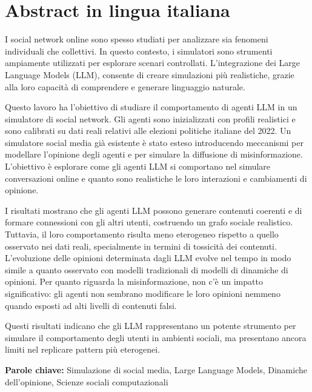 \section*{Abstract in lingua italiana}
I social network online sono spesso studiati per analizzare sia fenomeni individuali che collettivi. 
In questo contesto, i simulatori sono strumenti ampiamente utilizzati per esplorare scenari controllati.
L’integrazione dei Large Language Models (LLM), consente di creare simulazioni più realistiche, grazie alla loro capacità di comprendere e generare linguaggio naturale.

Questo lavoro ha l’obiettivo di studiare il comportamento di agenti LLM in un simulatore di social network.
Gli agenti sono inizializzati con profili realistici e sono calibrati su dati reali relativi alle elezioni politiche italiane del 2022.
Un simulatore social media già esistente è stato esteso introducendo meccanismi per modellare l’opinione degli agenti e per simulare la diffusione di misinformazione.
L’obiettivo è esplorare come gli agenti LLM si comportano nel simulare conversazioni online e quanto sono realistiche le loro interazioni e cambiamenti di opinione.

I risultati mostrano che gli agenti LLM possono generare contenuti coerenti e di formare connessioni con gli altri utenti, costruendo un grafo sociale realistico.
Tuttavia, il loro comportamento risulta meno eterogeneo rispetto a quello osservato nei dati reali, specialmente in termini di tossicità dei contenuti.
L’evoluzione delle opinioni determinata dagli LLM evolve nel tempo in modo simile a quanto osservato con modelli tradizionali di modelli di dinamiche di opinioni.
Per quanto riguarda la misinformazione, non c’è un impatto significativo: gli agenti non sembrano modificare le loro opinioni nemmeno quando esposti ad alti livelli di contenuti falsi.

Questi risultati indicano che gli LLM rappresentano un potente strumento per simulare il comportamento degli utenti in ambienti sociali, ma presentano ancora limiti nel replicare pattern più eterogenei.

\vspace{15pt}
\begin{tcolorbox}[arc=0pt, boxrule=0pt, colback=bluePoli!60, width=\textwidth, colupper=white]
    \textbf{Parole chiave:} Simulazione di social media, Large Language Models, Dinamiche dell'opinione, Scienze sociali computazionali
\end{tcolorbox}